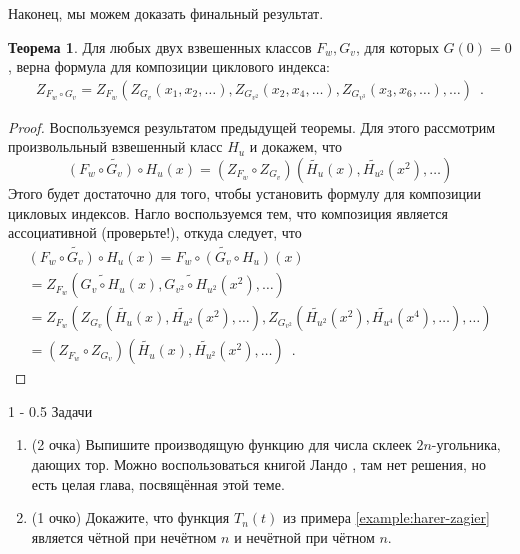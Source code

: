 \documentclass[a5paper]{article}
\makeatletter
\theoremstyle{definition}
\newtheorem*{theorem}{Теорема}
\renewcommand{\section}{\@startsection
{section}%
{1}%
{\z@}%
{-\baselineskip}%
{0.5\baselineskip}%
{\centering\large\scshape}} %
\makeatother
\begin{document}
Наконец, мы можем доказать финальный результат.
\begin{theorem}
    Для любых двух взвешенных классов \( F_w, G_v \), для которых \( G(0) = 0
\), верна формула для композиции циклового индекса:
\begin{multline*}
    Z_{F_w \circ G_v} 
= Z_{F_w}( Z_{G_v}(x_1, x_2,\ldots  ),
           Z_{G_{v^2}}(x_2, x_4, \ldots),
           Z_{G_{v^3}}(x_3, x_6, \ldots), \ldots)\enspace .
\end{multline*}
\end{theorem}
\begin{proof}
    Воспользуемся результатом предыдущей теоремы. Для этого рассмотрим
произвольльный взвешенный класс \( H_u \) и докажем, что
\[
    \widetilde{ (F_w \circ G_v) \circ H_u}(x) = (Z_{F_w} \circ Z_{G_v})
    \left(
        \widetilde{H_u}(x), \widetilde{H_{u^2}}(x^2), \ldots
    \right)
\]
Этого будет достаточно для того, чтобы установить формулу для композиции
цикловых индексов. Нагло воспользуемся тем, что композиция является
ассоциативной (проверьте!), откуда следует, что
\begin{multline*}
    \widetilde{ (F_w \circ G_v) \circ H_u}(x) =
    \widetilde{ F_w \circ (G_v \circ H_u)}(x) \\=
    Z_{F_w} \left(
        \widetilde{G_v \circ H_u}(x),
        \widetilde{G_{v^2} \circ H_{u^2}}(x^2),
        \ldots
    \right)  \\
= 
    Z_{F_w} \left(
        Z_{G_v}(\widetilde{H_u}(x), \widetilde{H_{u^2}}(x^2), \ldots),
        Z_{G_{v^2}}(\widetilde{H_{u^2}}(x^2), \widetilde{H_{u^4}}(x^4), \ldots),
        \ldots
    \right)  \\
= (Z_{F_w} \circ Z_{G_v}) (\widetilde{H_u}(x), \widetilde{H_{u^2}}(x^2), \ldots)
\enspace .
\end{multline*}
\end{proof}

\section{Задачи}

\begin{enumerate}
    \item(2 очка) Выпишите производящую функцию для числа склеек \( 2n \)-угольника,
дающих тор. Можно воспользоваться книгой Ландо \cite{lando}, там нет решения, но
есть целая глава, посвящённая этой теме.
    \item(1 очко) Докажите, что функция \( T_n(t) \) из примера
\ref{example:harer-zagier}
является чётной при нечётном \( n \) и нечётной при чётном \( n \).
\end{enumerate}

\footnotesize


    
\end{document}
